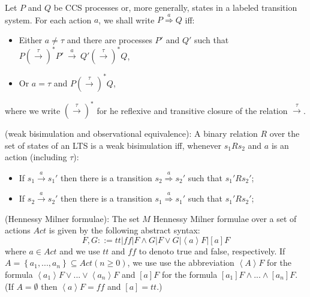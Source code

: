 \begin{definition}
Let $P$ and $Q$ be CCS processes or, more generally, states in a labeled transition system. For each action $a$, we shall write
$P\stackrel{a}{\Rightarrow}Q$ iff:
\begin{itemize}
	\item Either $a\neq\tau$ and there are processes $P'$ and $Q'$ such that $P\left(\stackrel{\tau}{\rightarrow}\right)^{*}P'\ \stackrel{a}{\rightarrow}\ Q'\left(\stackrel{\tau}{\rightarrow}\right)^{*}Q$,
	\item Or $a=\tau$ and $P\left(\stackrel{\tau}{\rightarrow}\right)^{*}Q$,
\end{itemize}
where we write $\left(\stackrel{\tau}{\rightarrow}\right)^{*}$ for he reflexive and transitive closure of the relation $\stackrel{\tau}{\rightarrow}$.
\end{definition}

\begin{definition}
(weak bisimulation and observational equivalence): A binary relation $R$ over the set of states of an LTS is a weak bisimulation iff, whenever $s_{1}Rs_{2}$ and $a$ is an action (including $\tau$):
\begin{itemize}
	\item If $s_{1}\stackrel{a}{\rightarrow}s_{1}'$ then there is a transition $s_{2}\stackrel{a}{\Rightarrow}s_{2}'$ such that $s_{1}'Rs_{2}'$;
	\item If $s_{2}\stackrel{a}{\rightarrow}s_{2}'$ then there is a transition $s_{1}\stackrel{a}{\Rightarrow}s_{1}'$ such that $s_{1}'Rs_{2}'$;
\end{itemize}
\end{definition}

\begin{definition}
(Hennessy Milner formulae): The set $M$ Hennessy Milner formulae over a set of actions $Act$ is given by the following abstract syntax:
\begin{equation*}
  F,G::=tt |ff | F\wedge G | F \vee G|\left\langle a \right\rangle F|\left[ a \right] F
\end{equation*}
where $a \in Act$ and we use $tt$ and $ff$ to denoto true and false, respectively. 
If $A=\left\{ a_{1},...,a_{n} \right\} \subseteq Act \left( n \geq 0\right)$, 
we use use the abbreviation $\left\langle A \right\rangle F$ for the formula 
$\left\langle a_{1} \right\rangle F \vee ... \vee \left\langle a_{n} \right\rangle F$ and 
$\left[ a \right] F$ for the formula 
$\left[ a_{1} \right] F \wedge ... \wedge \left[ a_{n} \right]F$. 
(If $A=\emptyset$ then $\left\langle a\right\rangle F=ff$ and $\left[a\right] = tt$.)
\end{definition}